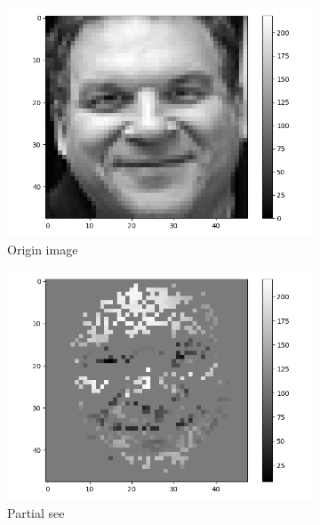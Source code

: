 \documentclass[12pt,a4paper]{extarticle}
\begin{document}
\begin{enumerate}
  \begin{figure}[ht]
    \begin{subfigure}[t]{0.32\textwidth}
      \centering
      \includegraphics[width=\linewidth]{images/origin-14.png}
      \caption{Origin image}
      \label{fig:origin-14}
    \end{subfigure}
    \begin{subfigure}[t]{0.32\textwidth}
      \centering
      \includegraphics[width=\linewidth]{images/partial-14.png}
      \caption{Partial see}
      \label{fig:partial-14}
    \end{subfigure}
    \begin{subfigure}[t]{0.32\textwidth}
      \centering

\end{subfigure}
\end{figure}
\end{enumerate}
\end{document}
